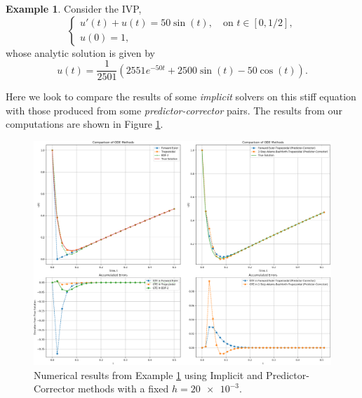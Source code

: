\documentclass[12pt, twoside]{report}
\theoremstyle{plain}
\theoremstyle{definition}
\theoremstyle{definition}
\newtheorem{example}{Example}[chapter]
\begin{document}
        \begin{example}
        \label{4_example_2}
            Consider the IVP,
            \begin{equation}
            \label{eq:4_ex_2}
                \begin{cases}
                    u'(t) + u(t) = 50\sin (t), \quad 
                    \text{on } t \in [0,1/2],\\
                    u(0) = 1,
                \end{cases}
            \end{equation}
            whose analytic solution is given by 
            \begin{equation}
            \label{eq:4_ex_sol_2}
                u(t) = \frac{1}{2501} \left( 2551e^{-50t} + 2500\sin(t)
                - 50\cos(t)  \right).
            \end{equation}

            Here we look to compare the results of some \textit{implicit} 
            solvers on this stiff equation with those produced from some
            \textit{predictor-corrector} pairs. The results from our 
            computations are shown in Figure \ref{4_ex_2_graphs}.          
        \end{example}
        
        \begin{figure}[H]
            \centering
                \includegraphics[width=\columnwidth]{2}
                \caption{Numerical results from Example \ref{4_example_2} using
                Implicit and Predictor-Corrector methods with a fixed 
                $h=\num{20e-3}$.}
                \label{4_ex_2_graphs}
        \end{figure}
\end{document}
